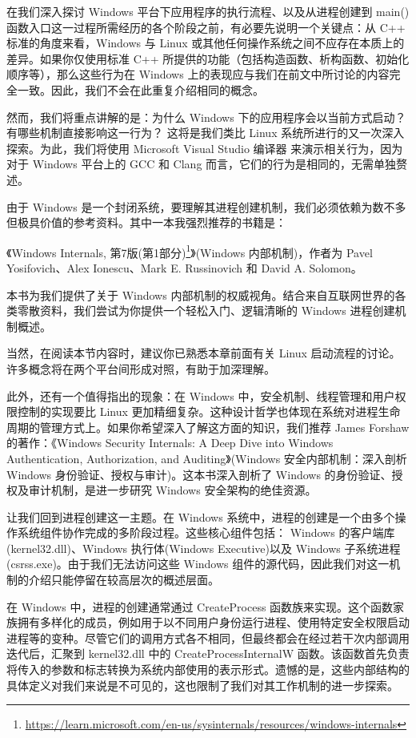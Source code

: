 
在我们深入探讨 Windows 平台下应用程序的执行流程、以及从进程创建到 main() 函数入口这一过程所需经历的各个阶段之前，有必要先说明一个关键点：从 C++ 标准的角度来看，Windows 与 Linux 或其他任何操作系统之间不应存在本质上的差异。如果你仅使用标准 C++ 所提供的功能（包括构造函数、析构函数、初始化顺序等），那么这些行为在 Windows 上的表现应与我们在前文中所讨论的内容完全一致。因此，我们不会在此重复介绍相同的概念。

然而，我们将重点讲解的是：为什么 Windows 下的应用程序会以当前方式启动？有哪些机制直接影响这一行为？ 这将是我们类比 Linux 系统所进行的又一次深入探索。为此，我们将使用 Microsoft Visual Studio 编译器 来演示相关行为，因为对于 Windows 平台上的 GCC 和 Clang 而言，它们的行为是相同的，无需单独赘述。

由于 Windows 是一个封闭系统，要理解其进程创建机制，我们必须依赖为数不多但极具价值的参考资料。其中一本我强烈推荐的书籍是：

《Windows Internals, 第7版(第1部分)\footnote{\url{https://learn.microsoft.com/en-us/sysinternals/resources/windows-internals}}》(Windows 内部机制)，作者为 Pavel Yosifovich、Alex Ionescu、Mark E. Russinovich 和 David A. Solomon。

本书为我们提供了关于 Windows 内部机制的权威视角。结合来自互联网世界的各类零散资料，我们尝试为你提供一个轻松入门、逻辑清晰的 Windows 进程创建机制概述。

当然，在阅读本节内容时，建议你已熟悉本章前面有关 Linux 启动流程的讨论。许多概念将在两个平台间形成对照，有助于加深理解。

此外，还有一个值得指出的现象：在 Windows 中，安全机制、线程管理和用户权限控制的实现要比 Linux 更加精细复杂。这种设计哲学也体现在系统对进程生命周期的管理方式上。如果你希望深入了解这方面的知识，我们推荐 James Forshaw 的著作：《Windows Security Internals: A Deep Dive into Windows Authentication, Authorization, and Auditing》(Windows 安全内部机制：深入剖析 Windows 身份验证、授权与审计)。这本书深入剖析了 Windows 的身份验证、授权及审计机制，是进一步研究 Windows 安全架构的绝佳资源。

让我们回到进程创建这一主题。在 Windows 系统中，进程的创建是一个由多个操作系统组件协作完成的多阶段过程。这些核心组件包括： Windows 的客户端库(kernel32.dll)、Windows 执行体(Windows Executive)以及 Windows 子系统进程(csrss.exe)。由于我们无法访问这些 Windows 组件的源代码，因此我们对这一机制的介绍只能停留在较高层次的概述层面。

在 Windows 中，进程的创建通常通过 CreateProcess 函数族来实现。这个函数家族拥有多样化的成员，例如用于以不同用户身份运行进程、使用特定安全权限启动进程等的变种。尽管它们的调用方式各不相同，但最终都会在经过若干次内部调用迭代后，汇聚到 kernel32.dll 中的 CreateProcessInternalW 函数。该函数首先负责将传入的参数和标志转换为系统内部使用的表示形式。遗憾的是，这些内部结构的具体定义对我们来说是不可见的，这也限制了我们对其工作机制的进一步探索。


